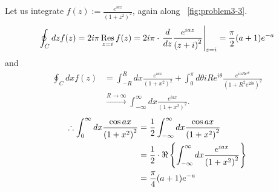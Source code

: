 \item

Let us integrate $f(z) := \frac{e^{iaz}}{{\left( 1 + z^2 \right)}^2}$, again along ~\ref{fig:problem3-3}.
\begin{align*}
	\oint_C dz f(z)
	= 2i\pi \mathop{\mathrm{Res}}_{z = i} f(z)
	= 2i\pi \cdot {\left. \frac{d}{dz} \frac{e^{iaz}}{{\left( z + i \right)}^2} \right|}_{z = i}
	= \frac{\pi}{2} (a + 1) e^{-a}
\end{align*}
and
\begin{align*}
	\oint_C dx f(z)
	 & = \int_{-R}^{R} dx \frac{e^{iax}}{{\left( 1 + x^2 \right)}^2}
	+\int_0^{\pi} d\theta iRe^{i\theta} \frac{e^{iaRe^{i\theta}}}{{\left( 1 + R^2 e^{2i\theta} \right)}^2}       \\
	 & \xrightarrow{R \rightarrow \infty} \int_{-\infty}^{\infty} dx \frac{e^{iax}}{{\left( 1 + x^2 \right)}^2}.
\end{align*}
\begin{align*}
	\therefore \int_{0}^{\infty} dx \frac{\cos ax}{{\left( 1 + x^2 \right)}^2}
	 & = \frac{1}{2} \int_{-\infty}^{\infty} dx \frac{\cos ax}{{\left( 1 + x^2 \right)}^2}                            \\
	 & = \frac{1}{2} \cdot \Re \left\{ \int_{-\infty}^{\infty} dx \frac{e^{iax}}{{\left( 1 + x^2 \right)}^2} \right\} \\
	 & = \frac{\pi}{4} (a + 1) e^{-a}
\end{align*}